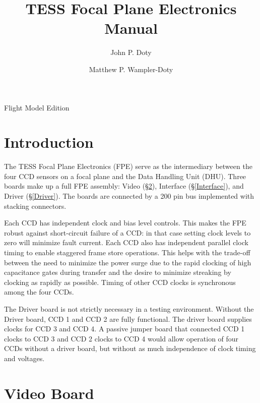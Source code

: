 \documentclass[12pt]{article}
\author{
John P. Doty \and Matthew P. Wampler-Doty
}
\title{TESS Focal Plane Electronics Manual}
\date{}
\let\oldsection\section
\renewcommand{\section}{\FloatBarrier\oldsection}
\begin{document}
\begin{titlepage}
\maketitle
\begin{center}
Flight Model Edition


% 
\end{center}
\end{titlepage} 

\tableofcontents

\listoffigures

\listoftables
\pagebreak

\section{Introduction}
The TESS Focal Plane Electronics (FPE) serve as the intermediary between the four CCD sensors on a focal plane and the Data Handling Unit (DHU). Three boards make up a full FPE assembly: Video (\S \ref{Video}), Interface (\S  \ref{Interface}), and Driver (\S \ref{Driver}). The boards are connected by a 200 pin bus implemented with stacking connectors. 

Each CCD has independent clock and bias level controls. This makes the FPE robust against short-circuit failure of a CCD: in that case setting clock levels to zero will minimize fault current. Each CCD also has independent parallel clock timing to enable staggered frame store operations. This helps with the trade-off between the need to minimize the power surge due to the rapid clocking of high capacitance gates during transfer and the desire to minimize streaking by clocking as rapidly as possible. Timing of other CCD clocks is synchronous among the four CCDs.

The Driver board is not strictly necessary in a testing environment. Without the Driver board, CCD 1 and CCD 2 are fully functional. The driver board supplies clocks for CCD 3 and CCD 4. A passive jumper board that connected CCD 1 clocks to CCD 3 and CCD 2 clocks to CCD 4 would allow operation of four CCDs without a driver board, but without as much independence of clock timing and voltages.

\section{Video Board}
\label{Video}
\end{document}
